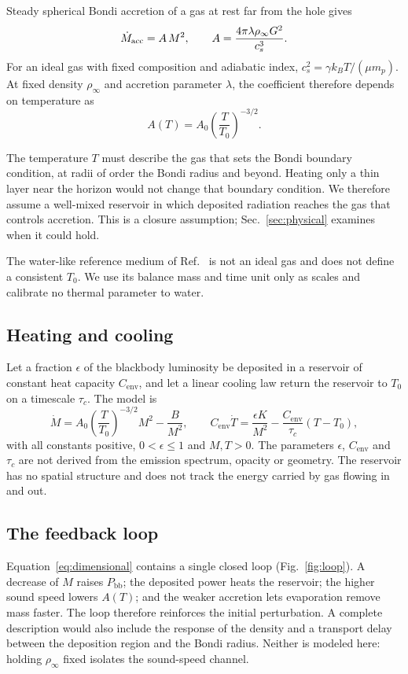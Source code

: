 \documentclass[11pt,a4paper]{article}
\newcommand{\Pbb}{P_{\mathrm{bb}}}
\newcommand{\Cenv}{C_{\mathrm{env}}}
\begin{document}
Steady spherical Bondi accretion of a gas at rest far from the hole gives~\cite{bondi}
\begin{equation*}
 \dot M_{\rm acc}=A\,M^2,\qquad A=\frac{4\pi\lambda\rho_\infty G^2}{c_s^3}.
\end{equation*}
For an ideal gas with fixed composition and adiabatic index, $c_s^2=\gamma k_BT/(\mu m_p)$. At fixed density $\rho_\infty$ and accretion parameter $\lambda$, the coefficient therefore depends on temperature as
\begin{equation}
 A(T)=A_0\left(\frac{T}{T_0}\right)^{-3/2}.
 \label{eq:AT}
\end{equation}

The temperature $T$ must describe the gas that sets the Bondi boundary condition, at radii of order the Bondi radius and beyond. Heating only a thin layer near the horizon would not change that boundary condition. We therefore assume a well-mixed reservoir in which deposited radiation reaches the gas that controls accretion. This is a closure assumption; Sec.~\ref{sec:physical} examines when it could hold.

The water-like reference medium of Ref.~\cite{paperI} is not an ideal gas and does not define a consistent $T_0$. We use its balance mass and time unit only as scales and calibrate no thermal parameter to water.

\subsection{Heating and cooling}
Let a fraction $\epsilon$ of the blackbody luminosity be deposited in a reservoir of constant heat capacity $\Cenv$, and let a linear cooling law return the reservoir to $T_0$ on a timescale $\tau_c$. The model is
\begin{equation}
 \dot M=A_0\left(\frac{T}{T_0}\right)^{-3/2}M^2-\frac{B}{M^2},\qquad
 \Cenv\dot T=\frac{\epsilon K}{M^2}-\frac{\Cenv}{\tau_c}(T-T_0),
 \label{eq:dimensional}
\end{equation}
with all constants positive, $0<\epsilon\le1$ and $M,T>0$. The parameters $\epsilon$, $\Cenv$ and $\tau_c$ are not derived from the emission spectrum, opacity or geometry. The reservoir has no spatial structure and does not track the energy carried by gas flowing in and out.

\subsection{The feedback loop}
Equation~\eqref{eq:dimensional} contains a single closed loop (Fig.~\ref{fig:loop}). A decrease of $M$ raises $\Pbb$; the deposited power heats the reservoir; the higher sound speed lowers $A(T)$; and the weaker accretion lets evaporation remove mass faster. The loop therefore reinforces the initial perturbation. A complete description would also include the response of the density and a transport delay between the deposition region and the Bondi radius. Neither is modeled here: holding $\rho_\infty$ fixed isolates the sound-speed channel.
\end{document}
